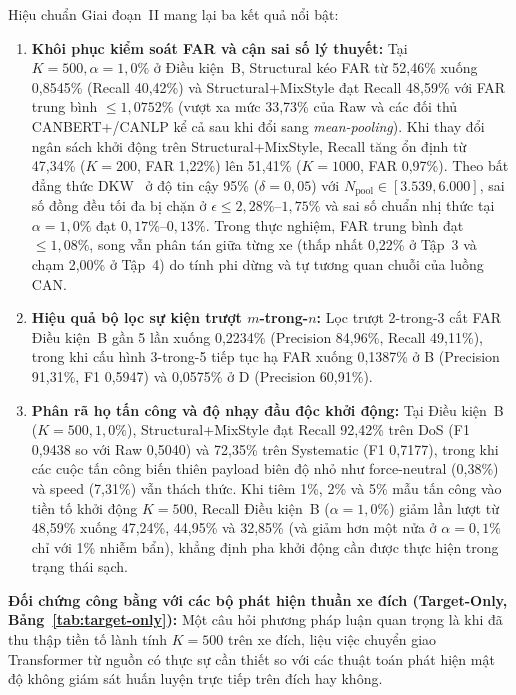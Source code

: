 \documentclass[12pt, a4paper, reqno, oneside]{book}
\begin{document}
Hiệu chuẩn Giai đoạn~II mang lại ba kết quả nổi bật:
\begin{enumerate}
  \item \textbf{Khôi phục kiểm soát FAR và cận sai số lý thuyết:} Tại $K=500, \alpha=1{,}0\%$ ở Điều kiện~B, Structural kéo FAR từ 52,46\% xuống 0,8545\% (Recall 40,42\%) và Structural+MixStyle đạt Recall 48,59\% với FAR trung bình $\le 1{,}0752\%$ (vượt xa mức 33,73\% của Raw và các đối thủ CANBERT+/CANLP kể cả sau khi đổi sang \textit{mean-pooling}). Khi thay đổi ngân sách khởi động trên Structural+MixStyle, Recall tăng ổn định từ 47,34\% ($K=200$, FAR 1,22\%) lên 51,41\% ($K=1000$, FAR 0,97\%). Theo bất đẳng thức DKW~\cite{massart1990dkw} ở độ tin cậy 95\% ($\delta=0{,}05$) với $N_{\text{pool}} \in [3.539, 6.000]$, sai số đồng đều tối đa bị chặn ở $\epsilon \le 2{,}28\%$--$1{,}75\%$ và sai số chuẩn nhị thức tại $\alpha=1{,}0\%$ đạt $0{,}17\%$--$0{,}13\%$. Trong thực nghiệm, FAR trung bình đạt $\le 1{,}08\%$, song vẫn phân tán giữa từng xe (thấp nhất 0,22\% ở Tập~3 và chạm 2,00\% ở Tập~4) do tính phi dừng và tự tương quan chuỗi của luồng CAN.
  \item \textbf{Hiệu quả bộ lọc sự kiện trượt $m$-trong-$n$:} Lọc trượt 2-trong-3 cắt FAR Điều kiện~B gần 5 lần xuống 0,2234\% (Precision 84,96\%, Recall 49,11\%), trong khi cấu hình 3-trong-5 tiếp tục hạ FAR xuống 0,1387\% ở B (Precision 91,31\%, F1 0,5947) và 0,0575\% ở D (Precision 60,91\%).
  \item \textbf{Phân rã họ tấn công và độ nhạy đầu độc khởi động:} Tại Điều kiện~B ($K=500, 1{,}0\%$), Structural+MixStyle đạt Recall 92,42\% trên DoS (F1 0,9438 so với Raw 0,5040) và 72,35\% trên Systematic (F1 0,7177), trong khi các cuộc tấn công biến thiên payload biên độ nhỏ như force-neutral (0,38\%) và speed (7,31\%) vẫn thách thức. Khi tiêm 1\%, 2\% và 5\% mẫu tấn công vào tiền tố khởi động $K=500$, Recall Điều kiện~B ($\alpha=1{,}0\%$) giảm lần lượt từ 48,59\% xuống 47,24\%, 44,95\% và 32,85\% (và giảm hơn một nửa ở $\alpha=0{,}1\%$ chỉ với 1\% nhiễm bẩn), khẳng định pha khởi động cần được thực hiện trong trạng thái sạch.
\end{enumerate}

\textbf{Đối chứng công bằng với các bộ phát hiện thuần xe đích (Target-Only, Bảng~\ref{tab:target-only}):} Một câu hỏi phương pháp luận quan trọng là khi đã thu thập tiền tố lành tính $K=500$ trên xe đích, liệu việc chuyển giao Transformer từ nguồn có thực sự cần thiết so với các thuật toán phát hiện mật độ không giám sát huấn luyện trực tiếp trên đích hay không.
\end{document}
